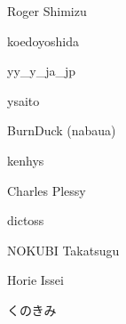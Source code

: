 \begin{prework}{ Roger Shimizu }
\end{prework}

\begin{prework}{ koedoyoshida }
\end{prework}

\begin{prework}{ yy\_y\_ja\_jp }
\end{prework}

\begin{prework}{ ysaito }
\end{prework}

\begin{prework}{ BurnDuck (nabaua) }
\end{prework}

\begin{prework}{ kenhys }
\end{prework}

\begin{prework}{ Charles Plessy }
\end{prework}

\begin{prework}{ dictoss }
\end{prework}

\begin{prework}{ NOKUBI Takatsugu }
\end{prework}

\begin{prework}{ Horie Issei }
\end{prework}

\begin{prework}{ くのきみ }
\end{prework}
